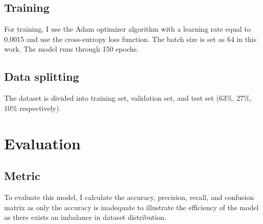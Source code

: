 \documentclass[conference]{IEEEtran}
\begin{document}
\subsection{Training}
For training, I use the Adam optimizer algorithm with a learning rate equal to 0.0015 and use the cross-entropy loss function. The batch size is set as 64 in this work. The model runs through 150 epochs.
\subsection{Data splitting}
The dataset is divided into training set, validation set, and test set (63\%, 27\%, 10\% respectively).
\section{Evaluation}
\subsection{Metric}
To evaluate this model, I calculate the accuracy, precision, recall, and confusion matrix as only the accuracy is inadequate to illustrate the efficiency of the model as there exists an imbalance in dataset distribution.
\end{document}
